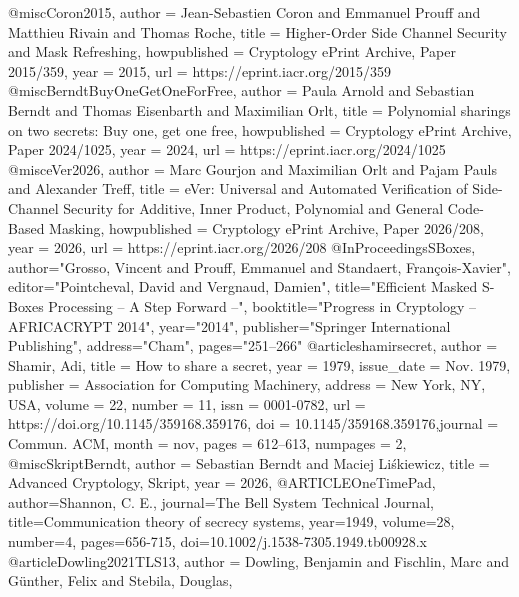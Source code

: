 \documentclass[english, version-2020-11]{uzl-thesis}
\begin{document}
  \begin{bibtex-entries}
    @misc{Coron2015,
      author = {Jean-Sebastien Coron and Emmanuel Prouff and Matthieu Rivain and Thomas Roche},
      title = {Higher-Order Side Channel Security and Mask Refreshing},
      howpublished = {Cryptology {ePrint} Archive, Paper 2015/359},
      year = {2015},
      url = {https://eprint.iacr.org/2015/359}
    }
    @misc{BerndtBuyOneGetOneForFree,
      author = {Paula Arnold and Sebastian Berndt and Thomas Eisenbarth and Maximilian Orlt},
      title = {Polynomial sharings on two secrets: Buy one, get one free},
      howpublished = {Cryptology {ePrint} Archive, Paper 2024/1025},
      year = {2024},
      url = {https://eprint.iacr.org/2024/1025}
    }
    @misc{eVer2026,
      author = {Marc Gourjon and Maximilian Orlt and Pajam Pauls and Alexander Treff},
      title = {{eVer}: Universal and Automated Verification of Side-Channel Security for Additive, Inner Product, Polynomial and General Code-Based Masking},
      howpublished = {Cryptology {ePrint} Archive, Paper 2026/208},
      year = {2026},
      url = {https://eprint.iacr.org/2026/208}
    }   
    @InProceedings{SBoxes,
      author="Grosso, Vincent and Prouff, Emmanuel and Standaert, Fran{\c{c}}ois-Xavier",
      editor="Pointcheval, David and Vergnaud, Damien",
      title="Efficient Masked S-Boxes Processing -- A Step Forward --",
      booktitle="Progress in Cryptology -- AFRICACRYPT 2014",
      year="2014",
      publisher="Springer International Publishing",
      address="Cham",
      pages="251--266"
      }
    @article{shamirsecret,
      author = {Shamir, Adi},
      title = {How to share a secret},
      year = {1979},
      issue_date = {Nov. 1979},
      publisher = {Association for Computing Machinery},
      address = {New York, NY, USA},
      volume = {22},
      number = {11},
      issn = {0001-0782},
      url = {https://doi.org/10.1145/359168.359176},
      doi = {10.1145/359168.359176},journal = {Commun. ACM},
      month = nov,
      pages = {612–613},
      numpages = {2},
    }
    @misc{SkriptBerndt,
      author = {Sebastian Berndt and Maciej Liśkiewicz},
      title = {Advanced Cryptology, Skript},
      year = {2026},
    }
    @ARTICLE{OneTimePad,
      author={Shannon, C. E.},
      journal={The Bell System Technical Journal}, 
      title={Communication theory of secrecy systems}, 
      year={1949},
      volume={28},
      number={4},
      pages={656-715},
      doi={10.1002/j.1538-7305.1949.tb00928.x}
    }
    @article{Dowling2021TLS13,
      author  = {Dowling, Benjamin and Fischlin, Marc and G{\"u}nther, Felix and Stebila, Douglas},
}
\end{bibtex-entries}
\end{document}
